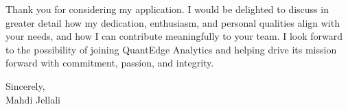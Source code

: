 \documentclass[letterpaper,11pt]{article}
\begin{document}
    Thank you for considering my application. I would be delighted to discuss in greater detail how my dedication, enthusiasm, and personal qualities align with your needs, and how I can contribute meaningfully to your team. I look forward to the possibility of joining QuantEdge Analytics and helping drive its mission forward with commitment, passion, and integrity.

    Sincerely,\\[12pt]

    Mahdi Jellali
\end{document}

